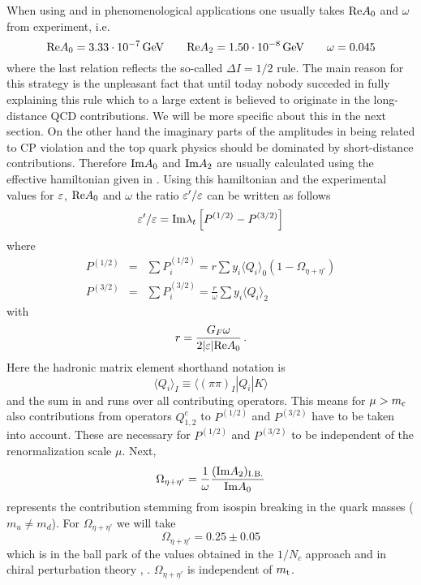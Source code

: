 When using  and  in phenomenological
applications one usually takes ${\rm Re} A_0$ and $\omega$ from
experiment, i.e.
\begin{equation}
{\rm Re} A_0 = 3.33 \cdot 10^{-7}\, {\rm GeV}
\qquad
{\rm Re} A_2 = 1.50 \cdot 10^{-8}\, {\rm GeV}
\qquad
\omega = 0.045
\label{eq:ReA0data}
\end{equation}
where the last relation reflects the so-called $\Delta I=1/2$ rule. The
main reason for this strategy is the unpleasant fact that until today
nobody succeded in fully explaining this rule which to a large extent is
believed to originate in the long-distance QCD contributions. We will be
more specific about this in the next section. On the other hand the
imaginary parts of the amplitudes in  being related to
CP violation and the top quark physics should be dominated by
short-distance contributions. Therefore ${\rm Im} A_0$ and ${\rm Im} A_2$ are
usually calculated using the effective hamiltonian given in
. Using this hamiltonian and the experimental
values for $\varepsilon$, ${\rm Re} A_0$ and $\omega$ the ratio $\varepsilon'/\varepsilon$ can be
written as follows
\begin{equation}
\varepsilon'/\varepsilon = {\rm Im} \lambda_t \left[ P^{(1/2)} - P^{(3/2)} \right]
\label{eq:epe}
\end{equation}
where
\begin{eqnarray}
P^{(1/2)} &=& \sum P_i^{(1/2)} = r \sum y_i \langle Q_i\rangle_0
(1-\Omega_{\eta+\eta'})
\label{eq:P12} \\
P^{(3/2)} &=& \sum P_i^{(3/2)} = \frac{r}{\omega}
\sum y_i \langle Q_i\rangle_2
\label{eq:P32}
\end{eqnarray}
with
\begin{equation}
r = \frac{G_F \omega}{2 |\varepsilon| {\rm Re} A_0} \, .
\label{eq:repe}
\end{equation}
Here the hadronic matrix element shorthand notation is
\begin{equation}
\langle Q_i\rangle_I \equiv \langle (\pi\pi)_I | Q_i | K \rangle
\label{eq:QiKpp}
\end{equation}
and the sum in  and  runs over all contributing
operators. This means for $\mu > m_{\rm c}$ also contributions from operators
$Q^c_{1,2}$ to $P^{(1/2)}$ and $P^{(3/2)}$ have to be taken into
account. These are necessary for $P^{(1/2)}$ and $P^{(3/2)}$ to be
independent of the renormalization scale $\mu$. Next,
\begin{equation}
\Omega_{\eta+\eta'} = \frac{1}{\omega} \frac{({\rm Im} A_2)_{\rm
I.B.}}{{\rm Im} A_0}
\label{eq:Omegaeta}
\end{equation}
represents the contribution stemming from isospin breaking in the quark masses
($m_u \not= m_d$). For $\Omega_{\eta+\eta'}$ we will take
\begin{equation}
\Omega_{\eta+\eta'} = 0.25 \pm 0.05
\label{eq:Omegaetadata}
\end{equation}
which is in the ball park of the values obtained in the $1/N_c$ approach
\cite{burasgerard:87} and in chiral perturbation theory
\cite{donoghueetal:86}, \cite{lusignoli:89}. $\Omega_{\eta+\eta'}$ is
independent of $m_{\rm t}$.

